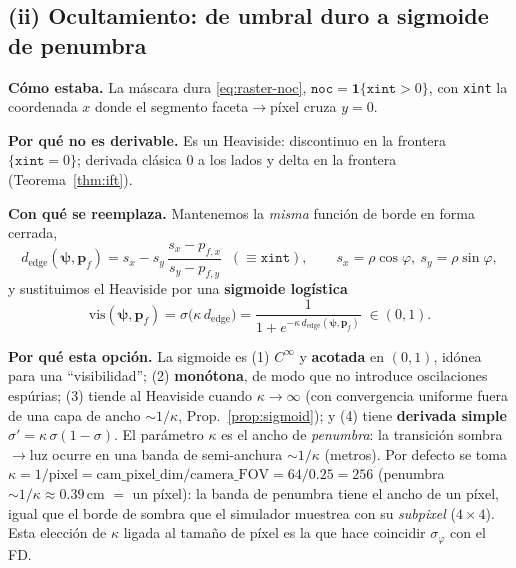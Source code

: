 \documentclass[11pt,a4paper]{article}
\theoremstyle{plain}
\theoremstyle{definition}
\newcommand{\vect}[1]{\boldsymbol{#1}}
\begin{document}
\subsection{(ii) Ocultamiento: de umbral duro a sigmoide de penumbra}
\label{sec:vis}

\textbf{C\'omo estaba.} La m\'ascara dura \eqref{eq:raster-noc},
$\texttt{noc}=\mathbf 1\{\texttt{xint}>0\}$, con \texttt{xint} la coordenada $x$
donde el segmento faceta$\to$p\'ixel cruza $y=0$.

\textbf{Por qu\'e no es derivable.} Es un Heaviside: discontinuo en la frontera
$\{\texttt{xint}=0\}$; derivada cl\'asica $0$ a los lados y delta en la frontera
(Teorema~\ref{thm:ift}).

\textbf{Con qu\'e se reemplaza.} Mantenemos la \emph{misma} funci\'on de borde en
forma cerrada,
\begin{equation}
    d_{\mathrm{edge}}(\vect{\psi},\vect{p}_f)
    =s_x - s_y\,\frac{s_x-p_{f,x}}{s_y-p_{f,y}}
    \;\;(\equiv\texttt{xint}),
    \qquad s_x=\rho\cos\varphi,\ s_y=\rho\sin\varphi,
    \label{eq:dedge}
\end{equation}
y sustituimos el Heaviside por una \textbf{sigmoide log\'istica}
\begin{equation}
    \boxed{\;
    \mathrm{vis}(\vect{\psi},\vect{p}_f)
    =\sigma\!\bigl(\kappa\,d_{\mathrm{edge}}\bigr)
    =\frac{1}{1+e^{-\kappa\, d_{\mathrm{edge}}(\vect{\psi},\vect{p}_f)}}
    \;\in(0,1).
    \;}
    \label{eq:sigmoid}
\end{equation}

\textbf{Por qu\'e esta opci\'on.} La sigmoide es (1) $C^\infty$ y \textbf{acotada}
en $(0,1)$, id\'onea para una ``visibilidad''; (2) \textbf{mon\'otona}, de modo que
no introduce oscilaciones esp\'urias; (3) tiende al Heaviside cuando
$\kappa\to\infty$ (con convergencia uniforme fuera de una capa de ancho
$\sim1/\kappa$, Prop.~\ref{prop:sigmoid}); y (4) tiene \textbf{derivada simple}
$\sigma'=\kappa\,\sigma(1-\sigma)$. El par\'ametro $\kappa$ es el ancho de
\emph{penumbra}: la transici\'on sombra$\to$luz ocurre en una banda de
semi-anchura $\sim1/\kappa$ (metros). Por defecto se toma $\kappa=1/\text{pixel}=
\text{cam\_pixel\_dim}/\text{camera\_FOV}=64/0.25=256$ (penumbra
$\sim1/\kappa\approx0.39$\,cm $=$ un p\'ixel): la banda de penumbra tiene el ancho
de un p\'ixel, igual que el borde de sombra que el simulador muestrea con su
\emph{subpixel} ($4{\times}4$). Esta elecci\'on de $\kappa$ ligada al tama\~no de
p\'ixel es la que hace coincidir $\sigma_\varphi$ con el FD.
\end{document}

